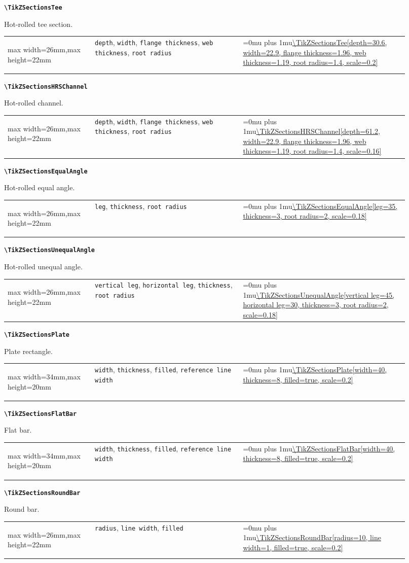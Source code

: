 \documentclass[10pt]{article}
\makeatletter
\newcommand{\command}[1]{\texttt{\textbackslash #1}}
\newcommand{\keyname}[1]{\texttt{#1}}
\newcommand{\CodeInline}[1]{%
  \begingroup
  \ttfamily\scriptsize\raggedright\Urlmuskip=0mu plus 1mu\url{#1}%
  \endgroup
}
\newcommand{\ShapePreview}[1]{%
  \begin{center}
  \begin{adjustbox}{max width=26mm,max height=22mm}
    \begin{tikzpicture}
      #1
    \end{tikzpicture}
  \end{adjustbox}
  \end{center}
}
\newcommand{\WideShapePreview}[1]{%
  \begin{center}
  \begin{adjustbox}{max width=34mm,max height=20mm}
    \begin{tikzpicture}
      #1
    \end{tikzpicture}
  \end{adjustbox}
  \end{center}
}
\newcommand{\ReferenceRow}[6]{%
  \textbf{\command{#1}}\par
  #2\par
  \vspace{2pt}
  \begin{tabular}{@{}p{0.20\linewidth}p{0.34\linewidth}p{0.38\linewidth}@{}}
    #6 & \footnotesize #3 & \CodeInline{#4}
  \end{tabular}
  \par\vspace{4mm}
}
\makeatother
\begin{document}
\ReferenceRow
  {TikZSectionsTee}
  {Hot-rolled tee section.}
  {\keyname{depth}, \keyname{width}, \keyname{flange thickness}, \keyname{web thickness}, \keyname{root radius}}
  {\TikZSectionsTee[depth=30.6, width=22.9, flange thickness=1.96, web thickness=1.19, root radius=1.4, scale=0.2]}
  {}
  {\ShapePreview{\TikZSectionsTee[depth=30.6, width=22.9, flange thickness=1.96, web thickness=1.19, root radius=1.4, scale=0.2]}}

\ReferenceRow
  {TikZSectionsHRSChannel}
  {Hot-rolled channel.}
  {\keyname{depth}, \keyname{width}, \keyname{flange thickness}, \keyname{web thickness}, \keyname{root radius}}
  {\TikZSectionsHRSChannel[depth=61.2, width=22.9, flange thickness=1.96, web thickness=1.19, root radius=1.4, scale=0.16]}
  {}
  {\ShapePreview{\TikZSectionsHRSChannel[depth=61.2, width=22.9, flange thickness=1.96, web thickness=1.19, root radius=1.4, scale=0.16]}}

\ReferenceRow
  {TikZSectionsEqualAngle}
  {Hot-rolled equal angle.}
  {\keyname{leg}, \keyname{thickness}, \keyname{root radius}}
  {\TikZSectionsEqualAngle[leg=35, thickness=3, root radius=2, scale=0.18]}
  {}
  {\ShapePreview{\TikZSectionsEqualAngle[leg=35, thickness=3, root radius=2, scale=0.18]}}

\ReferenceRow
  {TikZSectionsUnequalAngle}
  {Hot-rolled unequal angle.}
  {\keyname{vertical leg}, \keyname{horizontal leg}, \keyname{thickness}, \keyname{root radius}}
  {\TikZSectionsUnequalAngle[vertical leg=45, horizontal leg=30, thickness=3, root radius=2, scale=0.18]}
  {}
  {\ShapePreview{\TikZSectionsUnequalAngle[vertical leg=45, horizontal leg=30, thickness=3, root radius=2, scale=0.18]}}

\ReferenceRow
  {TikZSectionsPlate}
  {Plate rectangle.}
  {\keyname{width}, \keyname{thickness}, \keyname{filled}, \keyname{reference line width}}
  {\TikZSectionsPlate[width=40, thickness=8, filled=true, scale=0.2]}
  {}
  {\WideShapePreview{\TikZSectionsPlate[width=40, thickness=8, filled=true, scale=0.2]}}

\ReferenceRow
  {TikZSectionsFlatBar}
  {Flat bar.}
  {\keyname{width}, \keyname{thickness}, \keyname{filled}, \keyname{reference line width}}
  {\TikZSectionsFlatBar[width=40, thickness=8, filled=true, scale=0.2]}
  {}
  {\WideShapePreview{\TikZSectionsFlatBar[width=40, thickness=8, filled=true, scale=0.2]}}

\ReferenceRow
  {TikZSectionsRoundBar}
  {Round bar.}
  {\keyname{radius}, \keyname{line width}, \keyname{filled}}
  {\TikZSectionsRoundBar[radius=10, line width=1, filled=true, scale=0.2]}
  {}
  {\ShapePreview{\TikZSectionsRoundBar[radius=10, line width=1, filled=true, scale=0.2]}}
\end{document}

